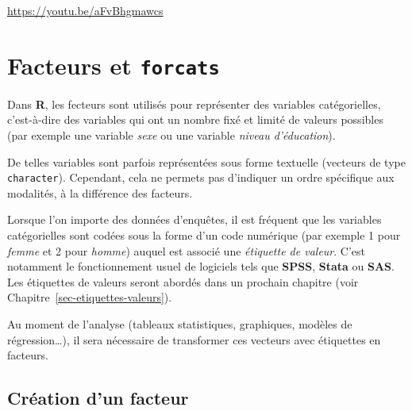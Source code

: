 \documentclass[
  letterpaper,
  DIV=11,
  numbers=noendperiod,
  oneside]{scrreprt}
\begin{document}
\url{https://youtu.be/aFvBhgmawcs}

\hypertarget{sec-facteurs}{%
\chapter{\texorpdfstring{Facteurs et
\texttt{forcats}}{Facteurs et forcats}}\label{sec-facteurs}}

Dans \textbf{R}, les fecteurs sont utilisés pour représenter des
variables catégorielles, c'est-à-dire des variables qui ont un nombre
fixé et limité de valeurs possibles (par exemple une variable
\emph{sexe} ou une variable \emph{niveau d'éducation}).

De telles variables sont parfois représentées sous forme textuelle
(vecteurs de type \texttt{character}). Cependant, cela ne permets pas
d'indiquer un ordre spécifique aux modalités, à la différence des
facteurs.

\begin{tcolorbox}[enhanced jigsaw, colbacktitle=quarto-callout-note-color!10!white, opacityback=0, toprule=.15mm, colback=white, coltitle=black, bottomtitle=1mm, toptitle=1mm, titlerule=0mm, rightrule=.15mm, title=\textcolor{quarto-callout-note-color}{\faInfo}\hspace{0.5em}{Note}, breakable, bottomrule=.15mm, opacitybacktitle=0.6, arc=.35mm, left=2mm, leftrule=.75mm, colframe=quarto-callout-note-color-frame]

Lorsque l'on importe des données d'enquêtes, il est fréquent que les
variables catégorielles sont codées sous la forme d'un code numérique
(par exemple 1 pour \emph{femme} et 2 pour \emph{homme}) auquel est
associé une \emph{étiquette de valeur}. C'est notamment le
fonctionnement usuel de logiciels tels que \textbf{SPSS}, \textbf{Stata}
ou \textbf{SAS}. Les étiquettes de valeurs seront abordés dans un
prochain chapitre (voir Chapitre~\ref{sec-etiquettes-valeurs}).

Au moment de l'analyse (tableaux statistiques, graphiques, modèles de
régression\ldots), il sera nécessaire de transformer ces vecteurs avec
étiquettes en facteurs.

\end{tcolorbox}

\hypertarget{cruxe9ation-dun-facteur}{%
\section{Création d'un facteur}\label{cruxe9ation-dun-facteur}}
\end{document}
